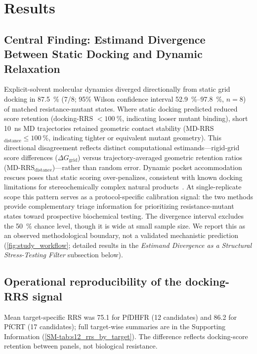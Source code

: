 \documentclass[journal=jcisd8,manuscript=article,layout=traditional]{achemso}
\begin{document}

\section{Results}

\subsection{Central Finding: Estimand Divergence Between Static Docking and Dynamic Relaxation} Explicit-solvent molecular dynamics diverged directionally from static grid docking in \qty{87.5}{\percent} (7/8; 95\% Wilson confidence interval \qtyrange{52.9}{97.8}{\percent}, $n=\num{8}$) of matched resistance-mutant states. Where static docking predicted reduced score retention (docking-RRS $< \qty{100}{\percent}$, indicating looser mutant binding), short \qty{10}{\ns} MD trajectories retained geometric contact stability (MD-RRS$_{\mathrm{distance}} \le \qty{100}{\percent}$, indicating tighter or equivalent mutant geometry). This directional disagreement reflects distinct computational estimands---rigid-grid score differences ($\Delta G_{\mathrm{grid}}$) versus trajectory-averaged geometric retention ratios (MD-RRS$_{\mathrm{distance}}$)---rather than random error. Dynamic pocket accommodation rescues poses that static scoring over-penalizes, consistent with known docking limitations for stereochemically complex natural products~\citep{ferreira2023docking}. At single-replicate scope this pattern serves as a protocol-specific calibration signal: the two methods provide complementary triage information for prioritizing resistance-mutant states toward prospective biochemical testing. The divergence interval excludes the \qty{50}{\percent} chance level, though it is wide at small sample size. We report this as an observed methodological boundary, not a validated mechanistic prediction (\cref{fig:study_workflow}; detailed results in the \textit{Estimand Divergence as a Structural Stress-Testing Filter} subsection below).

\subsection{Operational reproducibility of the docking-RRS signal}

Mean target-specific RRS was 75.1 for PfDHFR (12 candidates) and 86.2 for PfCRT (17 candidates); full target-wise summaries are in the Supporting Information (\cref{SM-tab:s12_rrs_by_target}). The difference reflects docking-score retention between panels, not biological resistance.
\end{document}
